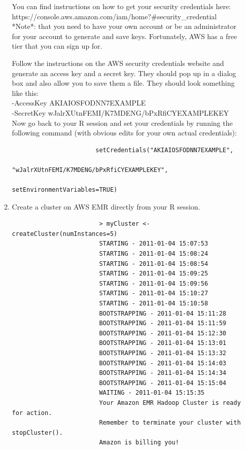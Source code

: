 \documentclass[a4paper, 11pt]{report}
\begin{document}
\begin{enumerate}
\begin{enumerate}
					You can find instructions on how to get your security credentials here: \\
					https://console.aws.amazon.com/iam/home?\#security\_credential \\
					*Note*: that you need to have your own account or be an administrator for your account to generate and save keys.  Fortunately, AWS has a free tier that you can sign up for.
						
					Follow the instructions on the AWS security credentials website and generate an access key and a secret key.  They should pop up in a dialog box and also allow you to save them a file.  They should look something like this:\\
					-AccessKey AKIAIOSFODNN7EXAMPLE \\
					-SecretKey wJalrXUtnFEMI/K7MDENG/bPxRfiCYEXAMPLEKEY \\
					
					Now go back to your R session and set your credentials by running the following command (with obvious edits for your own actual credentials): 
					
					\footnotesize\begin{verbatim}
					   setCredentials("AKIAIOSFODNN7EXAMPLE", 
					                  "wJalrXUtnFEMI/K7MDENG/bPxRfiCYEXAMPLEKEY", 
					                  setEnvironmentVariables=TRUE) 
					\end{verbatim}\normalsize
					   
				\item Create a cluster on AWS EMR directly from your R session.\\ \footnotesize
					\begin{verbatim}
						> myCluster <- createCluster(numInstances=5) 
						STARTING - 2011-01-04 15:07:53
						STARTING - 2011-01-04 15:08:24
						STARTING - 2011-01-04 15:08:54
						STARTING - 2011-01-04 15:09:25
						STARTING - 2011-01-04 15:09:56
						STARTING - 2011-01-04 15:10:27
						STARTING - 2011-01-04 15:10:58
						BOOTSTRAPPING - 2011-01-04 15:11:28
						BOOTSTRAPPING - 2011-01-04 15:11:59
						BOOTSTRAPPING - 2011-01-04 15:12:30
						BOOTSTRAPPING - 2011-01-04 15:13:01
						BOOTSTRAPPING - 2011-01-04 15:13:32
						BOOTSTRAPPING - 2011-01-04 15:14:03
						BOOTSTRAPPING - 2011-01-04 15:14:34
						BOOTSTRAPPING - 2011-01-04 15:15:04
						WAITING - 2011-01-04 15:15:35
						Your Amazon EMR Hadoop Cluster is ready for action. 
						Remember to terminate your cluster with stopCluster().
						Amazon is billing you! 
					\end{verbatim}  \normalsize
										

\end{enumerate}
\end{enumerate}
\end{document}
